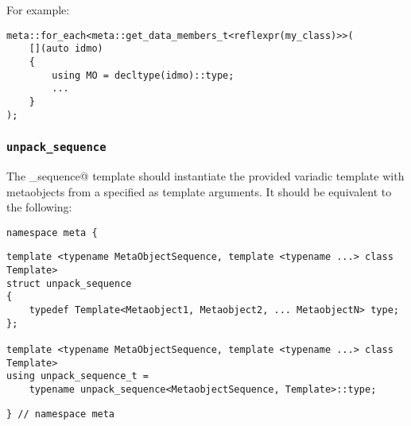 For example:

\begin{verbatim}
meta::for_each<meta::get_data_members_t<reflexpr(my_class)>>(
	[](auto idmo)
	{
		using MO = decltype(idmo)::type;
		...
	}
);
\end{verbatim}

\subsubsection{\texttt{unpack\_sequence}}

The \verb@unpack_sequence@ template should instantiate the provided variadic
template with metaobjects from a specified  as template
arguments. It should be equivalent to the following:

\begin{verbatim}
namespace meta {
\end{verbatim}
\begin{verbatim}
template <typename MetaObjectSequence, template <typename ...> class Template>
struct unpack_sequence
{
	typedef Template<Metaobject1, Metaobject2, ... MetaobjectN> type;
};

template <typename MetaObjectSequence, template <typename ...> class Template>
using unpack_sequence_t =
	typename unpack_sequence<MetaobjectSequence, Template>::type;
\end{verbatim}
\begin{verbatim}
} // namespace meta
\end{verbatim}

